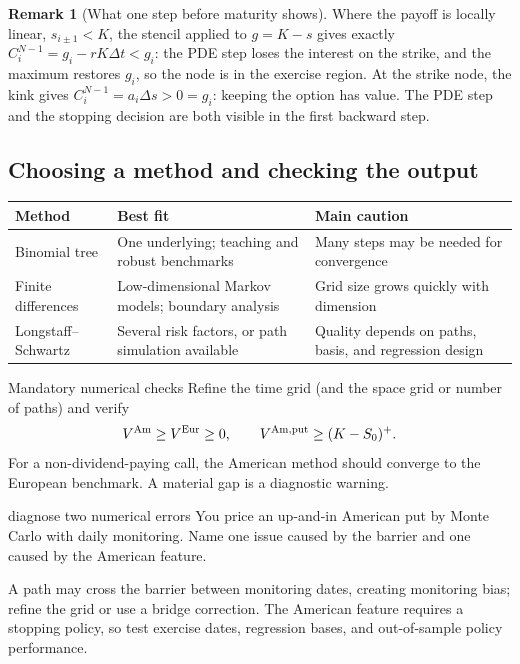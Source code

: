 \documentclass[10pt]{article}
\newcommand{\1}{\mathbf 1}
\theoremstyle{definition}
\newtheorem{remark}[definition]{Remark}
\begin{document}
\begin{remark}[What one step before maturity shows]
Where the payoff is locally linear, \(s_{i\pm1}<K\), the stencil applied
to \(g=K-s\) gives exactly \(C_i^{N-1}=g_i-rK\Delta t<g_i\): the PDE step
loses the interest on the strike, and the maximum restores \(g_i\), so the
node is in the exercise region. At the strike node, the kink gives
\(C_i^{N-1}=a_i\Delta s>0=g_i\): keeping the option has value. The PDE step and
the stopping decision are both visible in the first backward step.
\end{remark}

\subsection{Choosing a method and checking the output}

\begin{center}
\renewcommand{\arraystretch}{1.2}
\begin{tabular}{>{\raggedright\arraybackslash}p{}
                >{\raggedright\arraybackslash}p{}
                >{\raggedright\arraybackslash}p{}}
\toprule
Method & Best fit & Main caution\\
\midrule
Binomial tree & One underlying; teaching and robust benchmarks
  & Many steps may be needed for convergence\\
Finite differences & Low-dimensional Markov models; boundary analysis
  & Grid size grows quickly with dimension\\
Longstaff--Schwartz & Several risk factors, or path simulation available
  & Quality depends on paths, basis, and regression design\\
\bottomrule
\end{tabular}
\end{center}

\begin{warningbox}{Mandatory numerical checks}
Refine the time grid (and the space grid or number of paths) and verify
\[
V^{\rm Am}\geq V^{\rm Eur}\geq0,\qquad
V^{\rm Am,put}\geq(K-S_0)^+.
\]
For a non-dividend-paying call, the American method should converge to the
European benchmark. A material gap is a diagnostic warning.
\end{warningbox}

\begin{studentexercise}{diagnose two numerical errors}
You price an up-and-in American put by Monte Carlo with daily monitoring.
Name one issue caused by the barrier and one caused by the American feature.
\end{studentexercise}
\begin{shortsolution}
A path may cross the barrier between monitoring dates, creating monitoring
bias; refine the grid or use a bridge correction. The American feature
requires a stopping policy, so test exercise dates, regression bases, and
out-of-sample policy performance.
\end{shortsolution}
\end{document}
